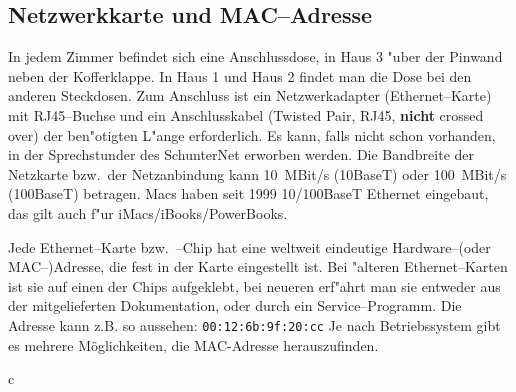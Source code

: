 
\subsection{Netzwerkkarte und MAC--Adresse}
\label{sec:netzw-und-mac}
In jedem Zimmer befindet sich eine Anschlussdose, in Haus 3 "uber der Pinwand
neben der Kofferklappe. In Haus 1 und Haus 2 findet man die Dose bei
den anderen Steckdosen. 
\rm Zum Anschluss ist ein Netzwerkadapter (Ethernet--Karte) mit RJ45--Buch\-se und
ein Anschlusskabel (Twisted Pair, RJ45, \textbf{nicht} crossed over) der
ben"otigten L"ange erforderlich. Es  kann, falls nicht schon
vorhanden, in der \glossar Sprechstunder des SchunterNet erworben werden.
Die Bandbreite der Netzkarte bzw.\  der Netzanbindung kann 10~MBit/s (10BaseT) oder 100~MBit/s (100BaseT) betragen. Macs haben seit 1999 10/100BaseT Ethernet eingebaut, das gilt auch
f"ur iMacs/iBooks/PowerBooks.

Jede Ethernet--Karte bzw.\ --Chip hat eine weltweit eindeutige Hardware--(oder
\glossar MAC--)Adresse, die fest in der Karte eingestellt ist. Bei "alteren
Ethernet--Karten ist sie auf einen der Chips aufgeklebt, bei neueren
erf"ahrt man sie entweder aus der mitgelieferten Dokumentation, oder
durch ein Service--Programm.%
Die Adresse kann z.B. so aussehen: \texttt{00:12:6b:9f:20:cc}
Je nach Betriebssystem gibt es mehrere Möglichkeiten, die MAC-Adresse
herauszufinden.


c%

